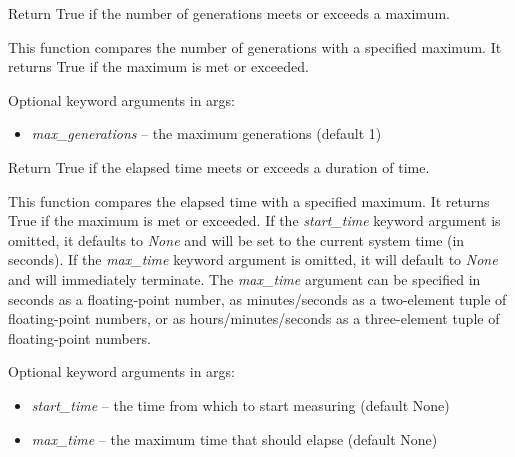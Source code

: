 \documentclass[letterpaper,10pt,english]{sphinxmanual}
\begin{document}
\begin{fulllineitems}
\label{reference:inspyred.ec.terminators.generation_termination}
Return True if the number of generations meets or exceeds a maximum.

This function compares the number of generations with a specified 
maximum. It returns True if the maximum is met or exceeded.

Optional keyword arguments in args:
\begin{itemize}
\item {} 
\emph{max\_generations} -- the maximum generations (default 1)

\end{itemize}

\end{fulllineitems}


\begin{fulllineitems}
\label{reference:inspyred.ec.terminators.time_termination}
Return True if the elapsed time meets or exceeds a duration of time.

This function compares the elapsed time with a specified maximum. 
It returns True if the maximum is met or exceeded. If the \emph{start\_time}
keyword argument is omitted, it defaults to \emph{None} and will be set to
the current system time (in seconds). If the \emph{max\_time} keyword argument
is omitted, it will default to \emph{None} and will immediately terminate.
The \emph{max\_time} argument can be specified in seconds as a floating-point
number, as minutes/seconds as a two-element tuple of floating-point
numbers, or as hours/minutes/seconds as a three-element tuple of 
floating-point numbers.

Optional keyword arguments in args:
\begin{itemize}
\item {} 
\emph{start\_time} -- the time from which to start measuring (default None)

\item {} 
\emph{max\_time} -- the maximum time that should elapse (default None)

\end{itemize}

\end{fulllineitems}
\end{document}

